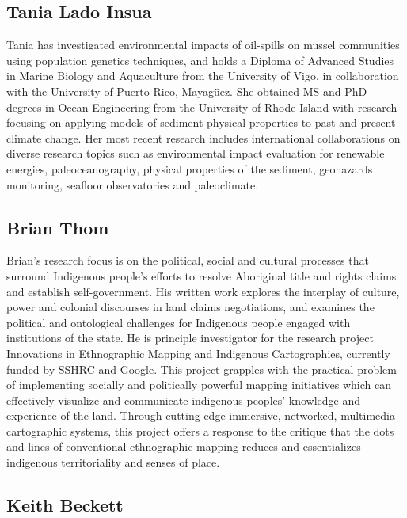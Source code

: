 \subsection*{Tania Lado Insua}

Tania has investigated environmental impacts of oil-spills on mussel
communities using population genetics techniques, and holds a Diploma
of Advanced Studies in Marine Biology and Aquaculture from the
University of Vigo, in collaboration with the University of Puerto
Rico, Mayagüez.  She obtained MS and PhD degrees in Ocean Engineering
from the University of Rhode Island with research focusing on applying
models of sediment physical properties to past and present climate
change. Her most recent research includes international collaborations
on diverse research topics such as environmental impact evaluation for
renewable energies, paleoceanography, physical properties of the
sediment, geohazards monitoring, seafloor observatories and
paleoclimate.


\subsection*{Brian Thom}

Brian’s research focus is on the political, social and cultural
processes that surround Indigenous people's efforts to resolve
Aboriginal title and rights claims and establish self-government.  His
written work explores the interplay of culture, power and colonial
discourses in land claims negotiations, and examines the political and
ontological challenges for Indigenous people engaged with institutions
of the state.  He is principle investigator for the research project
Innovations in Ethnographic Mapping and Indigenous Cartographies,
currently funded by SSHRC and Google. This project grapples with the
practical problem of implementing socially and politically powerful
mapping initiatives which can effectively visualize and communicate
indigenous peoples’ knowledge and experience of the land. Through
cutting-edge immersive, networked, multimedia cartographic systems,
this project offers a response to the critique that the dots and lines
of conventional ethnographic mapping reduces and essentializes
indigenous territoriality and senses of place.


\subsection*{Keith Beckett}

